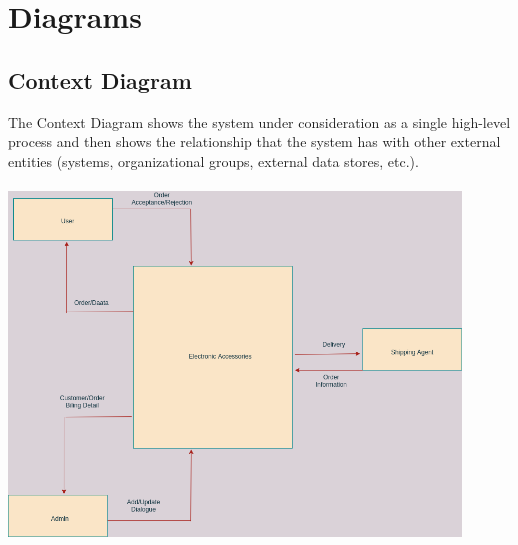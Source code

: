\documentclass{article}
\begin{document}
\section{Diagrams}
\subsection{Context Diagram}
The Context Diagram shows the system under consideration as a single high-level process and then shows the relationship that the system has with other external entities (systems, organizational groups, external data stores, etc.). 
\\
\\
\vspace{5\baselineskip}
\includegraphics[width=12cm]{images/context_dia.png}
\end{document}
